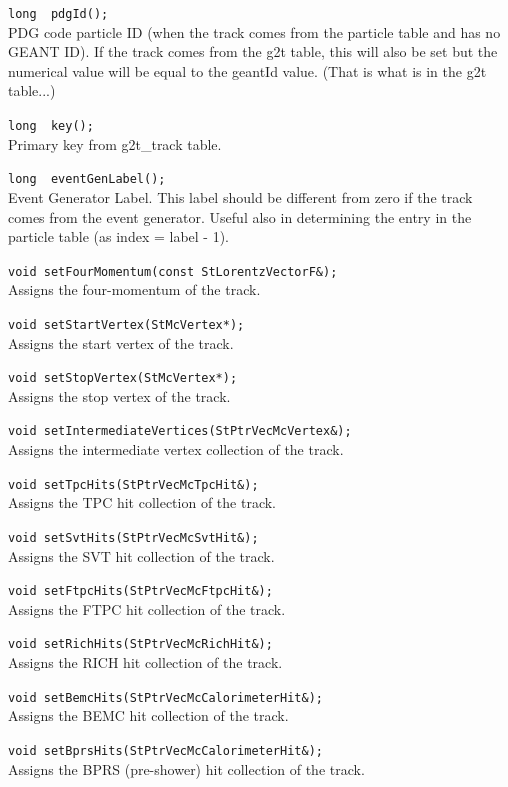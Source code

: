 \begin{Entry}
    \verb+long  pdgId();+\\
    PDG code particle ID (when the track comes from the particle table and has
    no GEANT ID).  If the track comes from the g2t table, this will also be set
    but the numerical value will be equal to the geantId value.  (That is what is
    in the g2t table...)

    \verb+long  key();+\\
    Primary key from g2t\_track table.

    \verb+long  eventGenLabel();+\\
    Event Generator Label.  This label should be different from zero if the track
    comes from the event generator.  Useful also in determining the entry in the
    particle table (as index = label - 1).

    \verb+void setFourMomentum(const StLorentzVectorF&);+\\
    Assigns the four-momentum of the track.

    \verb+void setStartVertex(StMcVertex*);+\\
    Assigns the start vertex of the track.

    \verb+void setStopVertex(StMcVertex*);+\\
    Assigns the stop vertex of the track.

    \verb+void setIntermediateVertices(StPtrVecMcVertex&);+\\
    Assigns the intermediate vertex collection of the track.

    \verb+void setTpcHits(StPtrVecMcTpcHit&);+\\
    Assigns the TPC hit collection of the track.

    \verb+void setSvtHits(StPtrVecMcSvtHit&);+\\
    Assigns the SVT hit collection of the track.

    \verb+void setFtpcHits(StPtrVecMcFtpcHit&);+\\
    Assigns the FTPC hit collection of the track.

    \verb+void setRichHits(StPtrVecMcRichHit&);+\\
    Assigns the RICH hit collection of the track.

    \verb+void setBemcHits(StPtrVecMcCalorimeterHit&);+\\
    Assigns the BEMC hit collection of the track.

    \verb+void setBprsHits(StPtrVecMcCalorimeterHit&);+\\
    Assigns the BPRS (pre-shower) hit collection of the track.


\end{Entry}

